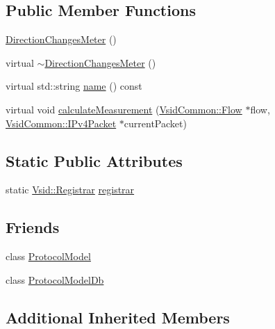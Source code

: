\subsection*{Public Member Functions}
\begin{DoxyCompactItemize}
\item 
\hyperlink{class_vsid_1_1_direction_changes_meter_a5bc8fb44a5318beba946f44a26f3e08b}{Direction\-Changes\-Meter} ()
\item 
virtual \hyperlink{class_vsid_1_1_direction_changes_meter_aa7176f254d9c13232f77e185a088933e}{$\sim$\-Direction\-Changes\-Meter} ()
\item 
virtual std\-::string \hyperlink{class_vsid_1_1_direction_changes_meter_a0c708fed3d322241c4d33aaa1ce4f05f}{name} () const 
\item 
virtual void \hyperlink{class_vsid_1_1_direction_changes_meter_a1c548c4b273d9fd3b336394ff4dbf424}{calculate\-Measurement} (\hyperlink{class_vsid_common_1_1_flow}{Vsid\-Common\-::\-Flow} $\ast$flow, \hyperlink{class_vsid_common_1_1_i_pv4_packet}{Vsid\-Common\-::\-I\-Pv4\-Packet} $\ast$current\-Packet)
\end{DoxyCompactItemize}
\subsection*{Static Public Attributes}
\begin{DoxyCompactItemize}
\item 
static \hyperlink{class_vsid_1_1_registrar}{Vsid\-::\-Registrar} \hyperlink{class_vsid_1_1_direction_changes_meter_a8b8e4a031632d62687f4a096c7501d5e}{registrar}
\end{DoxyCompactItemize}
\subsection*{Friends}
\begin{DoxyCompactItemize}
\item 
class \hyperlink{class_vsid_1_1_direction_changes_meter_a80219b863d4ff3456933d16bc5f73f45}{Protocol\-Model}
\item 
class \hyperlink{class_vsid_1_1_direction_changes_meter_a3c0d389e7a9476b06313d8fb9ca9fe68}{Protocol\-Model\-Db}
\end{DoxyCompactItemize}
\subsection*{Additional Inherited Members}


